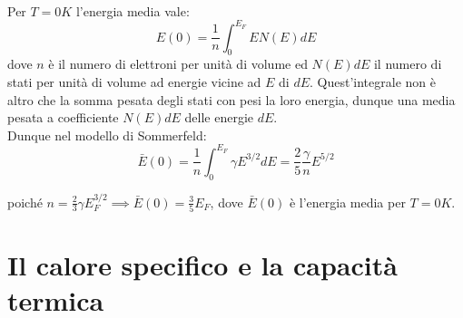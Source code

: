 \documentclass{book}
\begin{document}
            \paragraph{}
                Per $T = 0K$ l'energia media vale:
                $$E(0) = \frac{1}{n} \int_{0} ^{E_{F}} EN(E)dE$$
                dove $n$ è il numero di elettroni per unità di volume ed $N(E)dE$ il numero di stati per unità di volume ad energie vicine ad $E$ di $dE$.
                Quest'integrale non è altro che la somma pesata degli stati con pesi la loro energia, dunque una media pesata a coefficiente $N(E)dE$ delle energie $dE$.\\
                Dunque nel modello di Sommerfeld:
                $$\bar{E}(0) = \frac{1}{n} \int_{0} ^{E_{F}} \gamma E^{3/2} d E = \frac{2}{5} \frac{\gamma}{n}E^{5/2}$$
        
                poiché $n= \displaystyle \frac{2}{3} \gamma E_{F} ^{3/2} \implies \bar{E}(0) = \frac{3}{5} E_{F}$, dove $\bar{E}(0)$ è l'energia media per $T=0K$.

        \section{Il calore specifico e la capacità termica}
\end{document}
